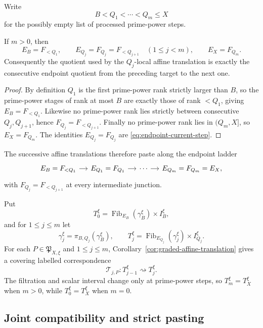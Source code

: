Write
\[
B<Q_1<\cdots<Q_m\le X
\]
for the possibly empty list of processed prime-power steps.

\begin{lemma}\label{lem:endpoint-ladder}
If $m>0$, then
\[
E_B=F_{<Q_1},
\qquad
E_{Q_j}=F_{Q_j}=F_{<Q_{j+1}}\quad(1\le j<m),
\qquad
E_X=F_{Q_m}.
\]
Consequently the quotient used by the $Q_j$-local affine translation is exactly the consecutive endpoint quotient from the preceding target to the next one.
\end{lemma}

\begin{proof}
By definition $Q_1$ is the first prime-power rank strictly larger than $B$, so the prime-power stages of rank at most $B$ are exactly those of rank $<Q_1$, giving $E_B=F_{<Q_1}$.  Likewise no prime-power rank lies strictly between consecutive $Q_j,Q_{j+1}$, hence $F_{Q_j}=F_{<Q_{j+1}}$.  Finally no prime-power rank lies in $(Q_m,X]$, so $E_X=F_{Q_m}$.  The identities $E_{Q_j}=F_{Q_j}$ are \eqref{eq:endpoint-current-step}.
\end{proof}

The successive affine translations therefore paste along the endpoint ladder
\begin{equation}\label{eq:endpoint-ladder-diagram}
\begin{tikzcd}[column sep=small]
E_B=F_{<Q_1} \arrow[r] & E_{Q_1}=F_{Q_1} \arrow[r] & \cdots \arrow[r] & E_{Q_m}=F_{Q_m}=E_X,
\end{tikzcd}
\end{equation}
with $F_{Q_j}=F_{<Q_{j+1}}$ at every intermediate junction.

Put
\[
T_0^\xi
=\operatorname{Fib}_{E_B}(\gamma_B^\xi)\times I_B^\xi,
\]
and for $1\le j\le m$ let
\[
\gamma_j^\xi=\pi_{B,Q_j}(\gamma_B^\xi),
\qquad
T_j^\xi
=\operatorname{Fib}_{E_{Q_j}}(\gamma_j^\xi)\times I_{Q_j}^\xi.
\]
For each $P\in\mathfrak P_{X,\xi}$ and $1\le j\le m$, Corollary~\ref{cor:graded-affine-translation} gives a covering labelled correspondence
\begin{equation}\label{eq:physical-local-translation-chain}
\mathscr T_{j,P}:T_{j-1}^\xi\rightsquigarrow T_j^\xi.
\end{equation}
The filtration and scalar interval change only at prime-power steps, so $T_m^\xi=T_X^\xi$ when $m>0$, while $T_0^\xi=T_X^\xi$ when $m=0$.

\subsection{Joint compatibility and strict pasting}

